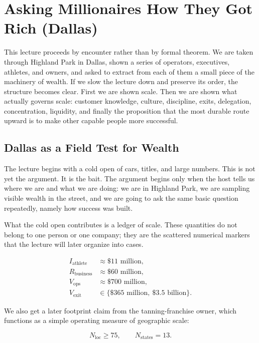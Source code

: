 \chapter{Asking Millionaires How They Got Rich (Dallas)}

This lecture proceeds by encounter rather than by formal theorem. We are taken through Highland Park in Dallas, shown a series of operators, executives, athletes, and owners, and asked to extract from each of them a small piece of the machinery of wealth. If we slow the lecture down and preserve its order, the structure becomes clear. First we are shown scale. Then we are shown what actually governs scale: customer knowledge, culture, discipline, exits, delegation, concentration, liquidity, and finally the proposition that the most durable route upward is to make other capable people more successful.

\section{Dallas as a Field Test for Wealth}

The lecture begins with a cold open of cars, titles, and large numbers. This is not yet the argument. It is the bait. The argument begins only when the host tells us where we are and what we are doing: we are in Highland Park, we are sampling visible wealth in the street, and we are going to ask the same basic question repeatedly, namely how success was built.

What the cold open contributes is a ledger of scale. These quantities do not belong to one person or one company; they are the scattered numerical markers that the lecture will later organize into cases.

\begin{align}
I_{\mathrm{athlete}} &\approx \$11\text{ million},\\
R_{\mathrm{business}} &\approx \$60\text{ million},\\
V_{\mathrm{ops}} &\approx \$700\text{ million},\\
V_{\mathrm{exit}} &\in \{\$365\text{ million},\ \$3.5\text{ billion}\}.
\end{align}

We also get a later footprint claim from the tanning-franchise owner, which functions as a simple operating measure of geographic scale:

\begin{equation}
N_{\mathrm{loc}} \ge 75,\qquad N_{\mathrm{states}} = 13.
\end{equation}

